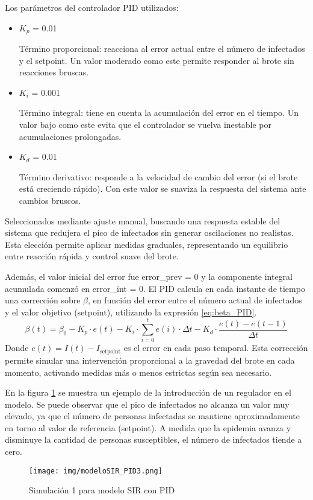Los parámetros del controlador PID utilizados:
\begin{itemize}
    \item $K_p$ = 0.01

    Término proporcional: reacciona al error actual entre el número de infectados y el setpoint.
    Un valor moderado como este permite responder al brote sin reacciones bruscas.
    \item $K_i$ = 0.001

    Término integral: tiene en cuenta la acumulación del error en el tiempo.
    Un valor bajo como este evita que el controlador se vuelva inestable por acumulaciones prolongadas.
    \item $K_d$ = 0.01

    Término derivativo: responde a la velocidad de cambio del error (si el brote está creciendo rápido).
Con este valor se suaviza la respuesta del sistema ante cambios bruscos.
\end{itemize}
Seleccionados mediante ajuste manual, buscando una respuesta estable del sistema que redujera el pico de infectados sin generar oscilaciones no realistas. Esta elección permite aplicar medidas graduales, representando un equilibrio entre reacción rápida y control suave del brote.

Además, el valor inicial del error fue error\_prev = 0 y la componente integral acumulada comenzó en error\_int = 0. El PID calcula en cada instante de tiempo una corrección sobre $\beta$, en función del error entre el número actual de infectados y el valor objetivo (setpoint), utilizando la expresión \eqref{eq:beta_PID}.
\begin{equation}
\beta(t) = \beta_0 - K_p \cdot e(t) - K_i \cdot \sum_{i=0}^{t} e(i) \cdot \Delta t - K_d \cdot \frac{e(t) - e(t - 1)}{\Delta t}
\label{eq:beta_PID}
\end{equation}
Donde $e(t) = I(t) - I_{\text{setpoint}}$ es el error en cada paso temporal. Esta corrección permite simular una intervención proporcional a la gravedad del brote en cada momento, activando medidas más o menos estrictas según sea necesario.

En la figura \ref{fig:simu3pid} se muestra un ejemplo de la introducción de un regulador en el modelo. Se puede observar que el pico de infectados no alcanza un valor muy elevado, ya que el número de personas infectadas se mantiene aproximadamente en torno al valor de referencia (setpoint). A medida que la epidemia avanza y disminuye la cantidad de personas susceptibles, el número de infectados tiende a cero.
\begin{figure}[H]
    \centering
    \texttt{[image: img/modeloSIR\_PID3.png]}
    \caption{Simulación 1 para modelo SIR con PID}
    \label{fig:simu3pid}
    \vspace{0.5cm} %
\end{figure}


